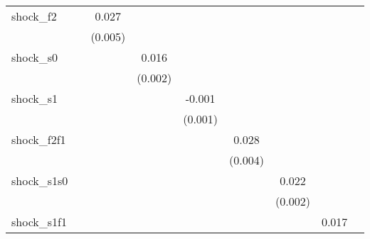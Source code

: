 {\begin{tabular}{l*{8}{c}}
\addlinespace
shock\_f2    &                     &       0.027\sym{***}&                     &                     &                     &                     &                     &                     \\
            &                     &     (0.005)         &                     &                     &                     &                     &                     &                     \\
\addlinespace
shock\_s0    &                     &                     &       0.016\sym{***}&                     &                     &                     &                     &                     \\
            &                     &                     &     (0.002)         &                     &                     &                     &                     &                     \\
\addlinespace
shock\_s1    &                     &                     &                     &      -0.001         &                     &                     &                     &                     \\
            &                     &                     &                     &     (0.001)         &                     &                     &                     &                     \\
\addlinespace
shock\_f2f1  &                     &                     &                     &                     &       0.028\sym{***}&                     &                     &                     \\
            &                     &                     &                     &                     &     (0.004)         &                     &                     &                     \\
\addlinespace
shock\_s1s0  &                     &                     &                     &                     &                     &       0.022\sym{***}&                     &                     \\
            &                     &                     &                     &                     &                     &     (0.002)         &                     &                     \\
\addlinespace
shock\_s1f1  &                     &                     &                     &                     &                     &                     &       0.017\sym{***}&                     \\

\end{tabular}}
